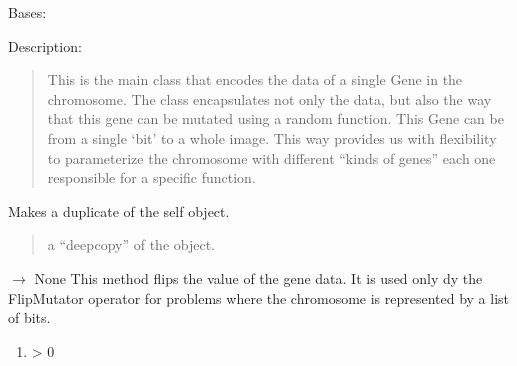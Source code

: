 \documentclass[letterpaper,10pt,english]{sphinxmanual}
\begin{document}
\begin{fulllineitems}
\label{\detokenize{pygenalgo.genome:pygenalgo.genome.gene.Gene}}
\pysigstartsignatures
\pysiglinewithargsret
{}
{\sphinxparamcomma {}\sphinxparamcomma {}}
{}
\pysigstopsignatures
\sphinxAtStartPar
Bases: 

\sphinxAtStartPar
Description:
\begin{quote}

\sphinxAtStartPar
This is the main class that encodes the data of a single Gene in the chromosome.
The class encapsulates not only the data, but also the way that this gene can be
mutated using a random function. This Gene can be from a single ‘bit’ to a whole
image. This way provides us with flexibility to parameterize the chromosome with
different “kinds of genes” each one responsible for a specific function.
\end{quote}

\begin{fulllineitems}
\label{\detokenize{pygenalgo.genome:pygenalgo.genome.gene.Gene.clone}}
\pysigstartsignatures
\pysiglinewithargsret
{}
{}
{}
\pysigstopsignatures
\sphinxAtStartPar
Makes a duplicate of the self object.
\begin{quote}\begin{description}
\sphinxAtStartPar
a “deep\sphinxhyphen{}copy” of the object.

\end{description}\end{quote}

\end{fulllineitems}


\begin{fulllineitems}
\label{\detokenize{pygenalgo.genome:pygenalgo.genome.gene.Gene.flip}}
\pysigstartsignatures
\pysiglinewithargsret
{}
{}
{{ $\rightarrow$ None}}
\pysigstopsignatures
\sphinxAtStartPar
This method flips the value of the gene data. It is used only dy the
FlipMutator operator for problems where the chromosome is represented
by a list of bits.
\begin{enumerate}
%
\item {} 
 \sphinxhyphen{}\textgreater{} 0


\end{enumerate}
\end{fulllineitems}
\end{fulllineitems}
\end{document}
